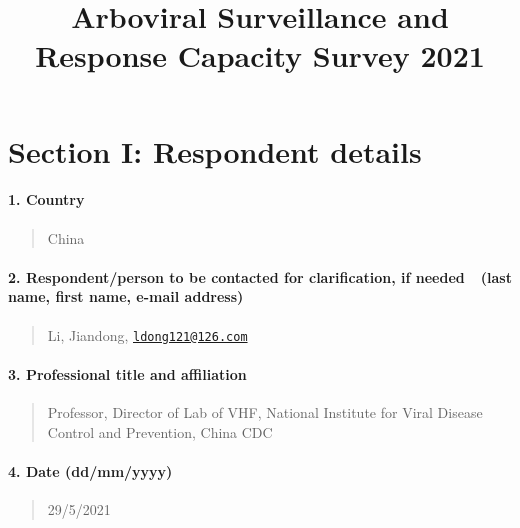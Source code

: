 \documentclass[
]{article}
\title{Arboviral Surveillance and Response Capacity Survey 2021}
\author{}
\date{\vspace{-2.5em}}
\begin{document}
\maketitle

\hypertarget{section-i-respondent-details}{%
\section{Section I: Respondent
details}\label{section-i-respondent-details}}

\hypertarget{country}{%
\paragraph{1. Country}\label{country}}

\begin{quote}
China
\end{quote}

\hypertarget{respondentperson-to-be-contacted-for-clarification-if-needed-last-name-first-name-e-mail-address}{%
\paragraph{2. Respondent/person to be contacted for clarification, if
needed~~(last name, first name, e-mail
address)}\label{respondentperson-to-be-contacted-for-clarification-if-needed-last-name-first-name-e-mail-address}}

\begin{quote}
Li, Jiandong,
\href{mailto:ldong121@126.com}{\nolinkurl{ldong121@126.com}}
\end{quote}

\hypertarget{professional-title-and-affiliation}{%
\paragraph{3. Professional title and
affiliation}\label{professional-title-and-affiliation}}

\begin{quote}
Professor, Director of Lab of VHF, National Institute for Viral Disease
Control and Prevention, China CDC
\end{quote}

\hypertarget{date-ddmmyyyy}{%
\paragraph{4. Date (dd/mm/yyyy)}\label{date-ddmmyyyy}}

\begin{quote}
29/5/2021
\end{quote}
\end{document}
